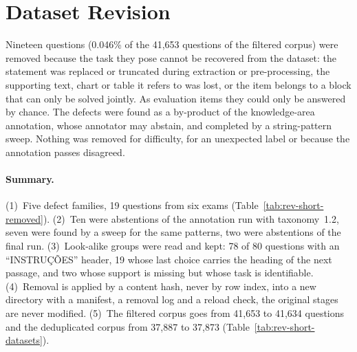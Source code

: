 %
%

\section{Dataset Revision}
\label{app:rev-short}

Nineteen questions (0.046\% of the 41,653 questions of the filtered corpus)
were removed because the task they pose cannot be recovered from the dataset:
the statement was replaced or truncated during extraction or pre-processing,
the supporting text, chart or table it refers to was lost, or the item belongs
to a block that can only be solved jointly. As evaluation items they could
only be answered by chance. The defects were found as a by-product of the
knowledge-area annotation, whose annotator may abstain, and completed by a
string-pattern sweep. Nothing was removed for difficulty, for an unexpected
label or because the annotation passes disagreed.

\paragraph{Summary.} (1)~Five defect families, 19 questions from six exams
(Table~\ref{tab:rev-short-removed}). (2)~Ten were abstentions of the
annotation run with taxonomy~1.2, seven were found by a sweep for the same
patterns, two were abstentions of the final run. (3)~Look-alike groups were
read and kept: 78 of 80 questions with an ``INSTRUÇÕES'' header, 19 whose
last choice carries the heading of the next passage, and two whose support is
missing but whose task is identifiable. (4)~Removal is applied by a content
hash, never by row index, into a new directory with a manifest, a removal log
and a reload check, the original stages are never modified. (5)~The filtered
corpus goes from 41,653 to 41,634 questions and the deduplicated corpus from
37,887 to 37,873 (Table~\ref{tab:rev-short-datasets}).

